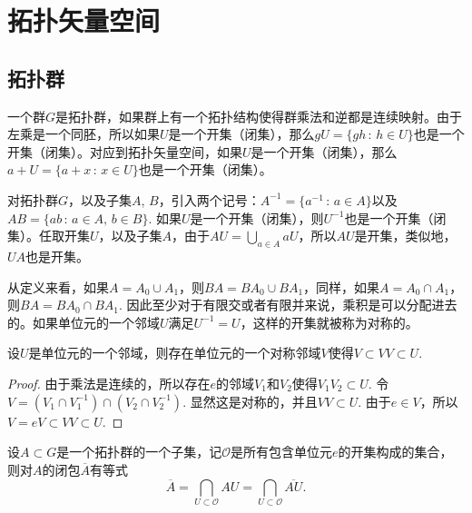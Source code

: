 \chapter{拓扑矢量空间}

\section{拓扑群}

一个群$G$是拓扑群，如果群上有一个拓扑结构使得群乘法和逆都是连续映射。由于左乘是一个同胚，所以如果$U$是一个开集（闭集），那么$gU=\{gh\,:\,h\in U\}$也是一个开集（闭集）。对应到拓扑矢量空间，如果$U$是一个开集（闭集），那么$a+U=\{a+x\,:\,x\in U\}$也是一个开集（闭集）。

对拓扑群$G$，以及子集$A$, $B$，引入两个记号：$A^{-1}=\{a^{-1}\,:\,a\in A\}$以及$AB=\{ab\,:\,a\in A,\, b\in B\}$. 如果$U$是一个开集（闭集），则$U^{-1}$也是一个开集（闭集）。任取开集$U$，以及子集$A$，由于$AU=\bigcup_{a\in A}aU$，所以$AU$是开集，类似地，$UA$也是开集。

从定义来看，如果$A=A_0\cup A_1$，则$BA=BA_0\cup BA_1$，同样，如果$A=A_0\cap A_1$，则$BA=BA_0\cap BA_1$. 因此至少对于有限交或者有限并来说，乘积是可以分配进去的。如果单位元的一个邻域$U$满足$U^{-1}=U$，这样的开集就被称为对称的。

\begin{lem}
设$U$是单位元的一个邻域，则存在单位元的一个对称邻域$V$使得$V\subset VV\subset U$. 
\end{lem}

\begin{proof}
	由于乘法是连续的，所以存在$e$的邻域$V_1$和$V_2$使得$V_1V_2\subset U$. 令$V=(V_1\cap V_1^{-1})\cap (V_2\cap V_2^{-1})$. 显然这是对称的，并且$VV\subset U$. 由于$e\in V$，所以$V=eV\subset VV\subset U$.
\end{proof}

\begin{lem}\label{lem:2}
设$A\subset G$是一个拓扑群的一个子集，记$\mathscr{O}$是所有包含单位元$e$的开集构成的集合，则对$A$的闭包$\overline{A}$有等式
\[
	\overline{A}=\bigcap_{U\subset \mathscr{O}}AU=\bigcap_{U\subset \mathscr{O}}\overline{AU}.
\]
\end{lem}

